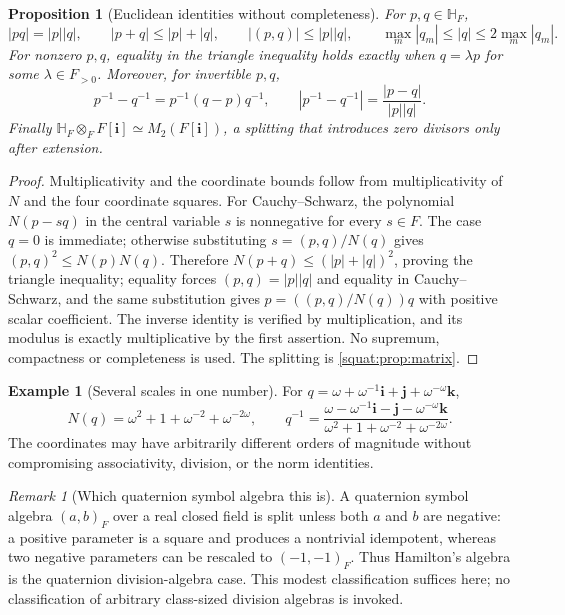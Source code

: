 \documentclass[11pt,letterpaper]{article}
\numberwithin{equation}{section}
\newtheorem{proposition}[proposition]{Proposition}
\theoremstyle{definition}
\newtheorem{example}[example]{Example}
\theoremstyle{remark}
\newtheorem{remark}[remark]{Remark}
\newcommand{\HF}{\mathbb H_F}
\newcommand{\ii}{\mathbf i}
\newcommand{\jj}{\mathbf j}
\newcommand{\kk}{\mathbf k}
\newcommand{\abs}[1]{\left|#1\right|}
\begin{document}
\begin{proposition}[Euclidean identities without completeness]\label{squat:prop:norm}
For $p,q\in\HF$,
\[
 \abs{pq}=\abs p\abs q,\qquad \abs{p+q}\le\abs p+\abs q,\qquad
 \abs{(p,q)}\le\abs p\abs q,\qquad
 \max_m\abs{q_m}\le\abs q\le2\max_m\abs{q_m}.
\]
For nonzero $p,q$, equality in the triangle inequality holds exactly when $q=\lambda p$
for some $\lambda\in F_{>0}$. Moreover, for invertible $p,q$,
\begin{equation}\label{squat:eq:inverse-lipschitz}
 p^{-1}-q^{-1}=p^{-1}(q-p)q^{-1},\qquad
 \abs{p^{-1}-q^{-1}}=\frac{\abs{p-q}}{\abs p\abs q}.
\end{equation}
Finally $\HF\otimes_FF[\ii]\simeq M_2(F[\ii])$, a splitting that introduces zero divisors
only after extension.
\end{proposition}
\begin{proof}
Multiplicativity and the coordinate bounds follow from multiplicativity of $N$ and the
four coordinate squares. For Cauchy--Schwarz, the polynomial $N(p-sq)$ in the central
variable $s$ is nonnegative for every $s\in F$. The case $q=0$ is immediate; otherwise
substituting $s=(p,q)/N(q)$ gives
$(p,q)^2\le N(p)N(q)$. Therefore $N(p+q)\le(\abs p+\abs q)^2$, proving the triangle
inequality; equality forces $(p,q)=\abs p\abs q$ and equality in Cauchy--Schwarz, and the
same substitution gives $p=((p,q)/N(q))q$ with positive scalar coefficient. The inverse
identity is verified by multiplication, and its modulus is exactly multiplicative by the
first assertion. No supremum, compactness or completeness is used. The splitting is
\cref{squat:prop:matrix}.
\end{proof}

\begin{example}[Several scales in one number]\label{squat:ex:scales}
For $q=\omega+\omega^{-1}\ii+\jj+\omega^{-\omega}\kk$,
\[
 N(q)=\omega^2+1+\omega^{-2}+\omega^{-2\omega},\qquad
 q^{-1}=\frac{\omega-\omega^{-1}\ii-\jj-\omega^{-\omega}\kk}
 {\omega^2+1+\omega^{-2}+\omega^{-2\omega}} .
\]
The coordinates may have arbitrarily different orders of magnitude without compromising
associativity, division, or the norm identities.
\end{example}

\begin{remark}[Which quaternion symbol algebra this is]\label{squat:rem:symbol}
A quaternion symbol algebra $(a,b)_F$ over a real closed field is split unless both $a$
and $b$ are negative: a positive parameter is a square and produces a nontrivial
idempotent, whereas two negative parameters can be rescaled to $(-1,-1)_F$. Thus
Hamilton's algebra is the quaternion division-algebra case. This modest classification
suffices here; no classification of arbitrary class-sized division algebras is invoked.
\end{remark}
\end{document}
